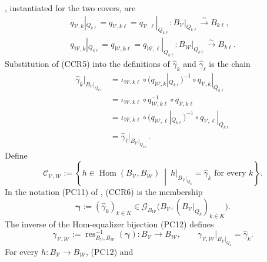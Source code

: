 \begin{definition}
  , instantiated for
  the two covers, are
  \[
  \begin{gathered}
    q_{\mathcal V,k}|_{Q_{k\ell}}
      =q_{\mathcal V,k\ell}
      =q_{\mathcal V,\ell}|_{Q_{k\ell}}
      \colon B_{\mathcal V}|_{Q_{k\ell}}\xrightarrow{\sim}B_{k\ell},\\
    q_{\mathcal W,k}|_{Q_{k\ell}}
      =q_{\mathcal W,k\ell}
      =q_{\mathcal W,\ell}|_{Q_{k\ell}}
      \colon B_{\mathcal W}|_{Q_{k\ell}}\xrightarrow{\sim}B_{k\ell}.
  \end{gathered}                                                    \tag{CCR5}
  \]
  Substitution of (CCR5) into the definitions of
  $\widehat\gamma_k$ and $\widehat\gamma_\ell$ is the chain
  \[
  \begin{aligned}
    \widehat\gamma_k|_{B_{\mathcal V}|_{Q_{k\ell}}}
      &=\iota_{\mathcal W,k\ell}\circ
        (q_{\mathcal W,k}|_{Q_{k\ell}})^{-1}\circ
        q_{\mathcal V,k}|_{Q_{k\ell}}\\
      &=\iota_{\mathcal W,k\ell}\circ
        q_{\mathcal W,k\ell}^{-1}\circ q_{\mathcal V,k\ell}\\
      &=\iota_{\mathcal W,k\ell}\circ
        (q_{\mathcal W,\ell}|_{Q_{k\ell}})^{-1}\circ
        q_{\mathcal V,\ell}|_{Q_{k\ell}}\\
      &=\widehat\gamma_\ell|_{B_{\mathcal V}|_{Q_{k\ell}}}.
  \end{aligned}                                                     \tag{CCR6}
  \]
  Define
  \[
    \mathscr C_{\mathcal V,\mathcal W}:=
      \left\{h\in\operatorname{Hom}(B_{\mathcal V},B_{\mathcal W})
        \ \middle|\
        h|_{B_{\mathcal V}|_{Q_k}}=\widehat\gamma_k
        \text{ for every }k\right\}.
  \]
  In the notation (PC11) of
  , (CCR6) is the membership
  \[
    \boldsymbol\gamma:=(\widehat\gamma_k)_{k\in K}
      \in\mathscr G_{B_{\mathcal W}}
        \bigl(B_{\mathcal V},(B_{\mathcal V}|_{Q_k})_{k\in K}\bigr).
                                                                    \tag{CCR7}
  \]
  The inverse of the Hom-equalizer bijection (PC12) defines
  \[
    \gamma_{\mathcal V,\mathcal W}:=
      \operatorname{res}_{B_{\mathcal V},B_{\mathcal W}}^{-1}
        (\boldsymbol\gamma)
      \colon B_{\mathcal V}\longrightarrow B_{\mathcal W},
    \qquad
    \gamma_{\mathcal V,\mathcal W}|_{B_{\mathcal V}|_{Q_k}}
      =\widehat\gamma_k.                                          \tag{CCR8}
  \]
  For every $h\colon B_{\mathcal V}\to B_{\mathcal W}$, (PC12) and

\end{definition}

